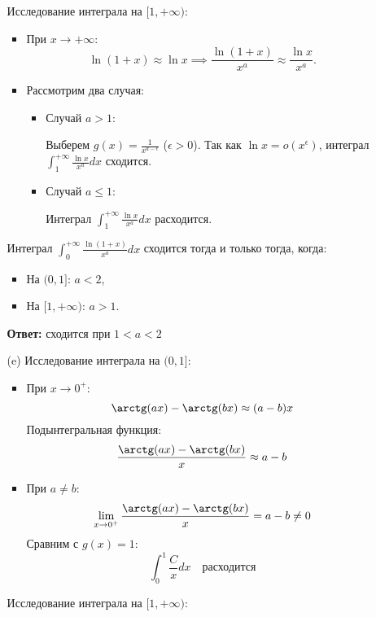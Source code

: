 \documentclass[a4paper]{article}
\renewcommand{\leq}{\leqslant}
\begin{document}
\begin{enumerate}
\begin{enumerate}
\begin{itemize}
    \end{itemize}
    Исследование интеграла на \([1, +\infty)\):
    \begin{itemize}
      \item  При \(x \to +\infty\):  
      \[
      \ln(1+x) \approx \ln x \implies \frac{\ln(1+x)}{x^a} \approx \frac{\ln x}{x^a}.
      \]  
      \item  Рассмотрим два случая:
      \begin{itemize}
        \item Случай \(a > 1\):
        
         Выберем \(g(x) =
         \frac{1}{x^{a - \epsilon}}\) (\(\epsilon > 0\)).
         Так как \(\ln x = o(x^\epsilon)\), интеграл \(\int_{1}^{+\infty}
          \frac{\ln x}{x^a} dx\) сходится.  

        \item Случай \(a \leq 1\):
        
         Интеграл \(\int_{1}^{+\infty} \frac{\ln x}{x^a} dx\) расходится.
      \end{itemize}
    \end{itemize}

     Интеграл \(\int_{0}^{+\infty} \frac{\ln(1+x)}{x^a} dx\) сходится
      тогда и только тогда, когда:  
    \begin{itemize}
      \item 
      На \((0, 1]\): \(a < 2\),  
      \item 
      На \([1, +\infty)\): \(a > 1\).  
    \end{itemize}

    \textbf{Ответ: } сходится при \(1 < a < 2\)\\

    \item[(e)]Исследование интеграла на \((0, 1]\):
    \begin{itemize}
      \item При \(x \to 0^+\):  
     \[
     \arctg(ax) - \arctg(bx) \approx (a - b)x
     \]  
     Подынтегральная функция:  
     \[
     \frac{\arctg(ax) - \arctg(bx)}{x} \approx a - b
     \]  

     \item При \(a \neq b\):  
     \[
     \lim_{x \to 0^+} \frac{\arctg(ax) - \arctg(bx)}{x} = a - b \neq 0
     \]  
     Сравним с \(g(x) = 1\):  
     \[
     \int_{0}^{1} \frac{C}{x} dx \quad \text{расходится}
     \]  
    \end{itemize}
    Исследование интеграла на \([1, +\infty)\):


\end{enumerate}
\end{enumerate}
\end{document}
